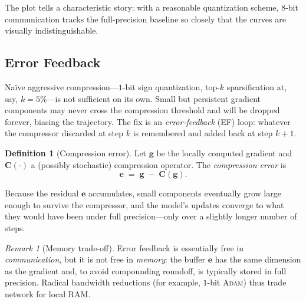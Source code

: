 \documentclass[11pt,a4paper]{article}
\theoremstyle{definition}
\newtheorem{definition}{Definition}[section]
\theoremstyle{remark}
\newtheorem*{remark}{Remark}
\theoremstyle{plain}
\begin{document}
The plot tells a characteristic story: with a reasonable quantization
scheme, $8$-bit communication tracks the full-precision baseline so
closely that the curves are visually indistinguishable.

\subsection{Error Feedback}

Na\"ive aggressive compression---$1$-bit sign quantization, top-$k$
sparsification at, say, $k=5\%$---is not sufficient on its own. Small but
persistent gradient components may never cross the compression threshold
and will be dropped forever, biasing the trajectory. The fix is an
\emph{error-feedback} (EF) loop: whatever the compressor discarded at
step $k$ is remembered and added back at step $k+1$.

\begin{definition}[Compression error]
Let $\mathbf{g}$ be the locally computed gradient and $\mathbf{C}(\cdot)$ a
(possibly stochastic) compression operator. The \emph{compression error}
is
\[
   \mathbf{e} \;=\; \mathbf{g} \;-\; \mathbf{C}(\mathbf{g}).
\]
\end{definition}

\begin{center}
\end{center}

Because the residual $\mathbf{e}$ accumulates, small components eventually
grow large enough to survive the compressor, and the model's updates
converge to what they would have been under full precision---only over a
slightly longer number of steps.

\begin{remark}[Memory trade-off]
Error feedback is essentially free in \emph{communication}, but it is not
free in \emph{memory}: the buffer $\mathbf{e}$ has the same dimension as
the gradient and, to avoid compounding roundoff, is typically stored in
full precision. Radical bandwidth reductions (for example, $1$-bit
\textsc{Adam}) thus trade network for local RAM.
\end{remark}
\end{document}
